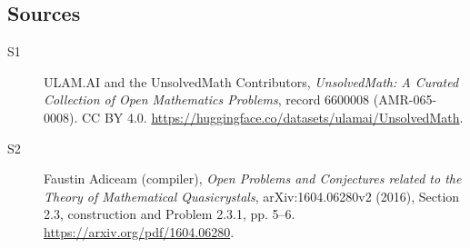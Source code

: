 \documentclass[11pt]{article}
\begin{document}
\subsection{Sources}
\begin{description}
\item[\hypertarget{source:6600008:1}{S1}] ULAM.AI and the UnsolvedMath Contributors, \emph{UnsolvedMath: A Curated Collection of Open Mathematics Problems}, record 6600008 (AMR-065-0008). CC BY 4.0. \url{https://huggingface.co/datasets/ulamai/UnsolvedMath}.
\item[\hypertarget{source:6600008:2}{S2}] Faustin Adiceam (compiler), \emph{Open Problems and Conjectures related to the Theory of Mathematical Quasicrystals}, arXiv:1604.06280v2 (2016), Section 2.3, construction and Problem 2.3.1, pp. 5--6. \url{https://arxiv.org/pdf/1604.06280}.
\end{description}
\label{end:6600008}
\end{document}
